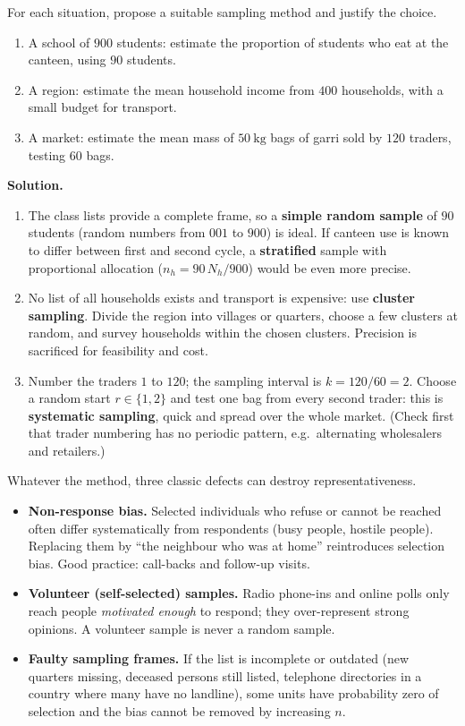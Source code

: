 \documentclass[11pt]{article}
\newcounter{popsec}
\newcounter{popsub}
\newcommand{\courssub}[1]{%
  \stepcounter{popsub}%
  \par\vspace{9pt}\noindent{\popxbold\fontsize{11.5}{13}\selectfont\color{popink}{\color{poporange}\thepopsec.\thepopsub}\hspace{6pt}#1}\par\nopagebreak\vspace{4pt}
}
\begin{document}
\begin{exoresolu}
For each situation, propose a suitable sampling method and justify the choice.
\begin{enumerate}
\item A school of $900$ students: estimate the proportion of students who eat at the canteen, using $90$ students.
\item A region: estimate the mean household income from $400$ households, with a small budget for transport.
\item A market: estimate the mean mass of $50\ \mathrm{kg}$ bags of garri sold by $120$ traders, testing $60$ bags.
\end{enumerate}
\tcblower
\textbf{Solution.}
\begin{enumerate}
\item The class lists provide a complete frame, so a \textbf{simple random sample} of $90$ students (random numbers from $001$ to $900$) is ideal. If canteen use is known to differ between first and second cycle, a \textbf{stratified} sample with proportional allocation ($n_h = 90\,N_h/900$) would be even more precise.
\item No list of all households exists and transport is expensive: use \textbf{cluster sampling}. Divide the region into villages or quarters, choose a few clusters at random, and survey households within the chosen clusters. Precision is sacrificed for feasibility and cost.
\item Number the traders $1$ to $120$; the sampling interval is $k = 120/60 = 2$. Choose a random start $r \in \{1,2\}$ and test one bag from every second trader: this is \textbf{systematic sampling}, quick and spread over the whole market. (Check first that trader numbering has no periodic pattern, e.g.\ alternating wholesalers and retailers.)
\end{enumerate}
\end{exoresolu}

\courssub{Sources of Bias}

Whatever the method, three classic defects can destroy representativeness.

\begin{itemize}
\item \textbf{Non-response bias.} Selected individuals who refuse or cannot be reached often differ systematically from respondents (busy people, hostile people). Replacing them by ``the neighbour who was at home'' reintroduces selection bias. Good practice: call-backs and follow-up visits.
\item \textbf{Volunteer (self-selected) samples.} Radio phone-ins and online polls only reach people \emph{motivated enough} to respond; they over-represent strong opinions. A volunteer sample is never a random sample.
\item \textbf{Faulty sampling frames.} If the list is incomplete or outdated (new quarters missing, deceased persons still listed, telephone directories in a country where many have no landline), some units have probability zero of selection and the bias cannot be removed by increasing $n$.
\end{itemize}
\end{document}
